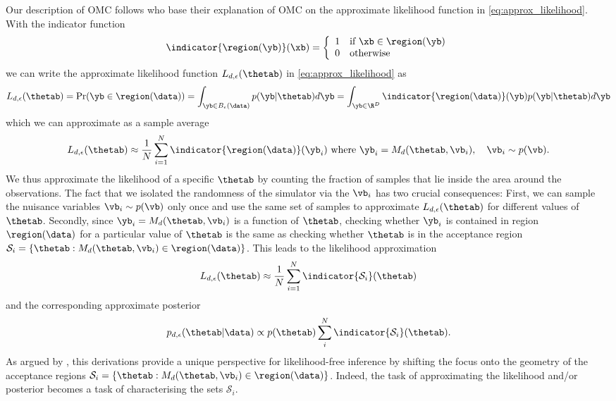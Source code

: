 Our description of OMC \citep{Meeds2015}
follows \citet{Ikonomov2019} who base their explanation of OMC on the
approximate likelihood function in \eqref{eq:approx_likelihood}. With
the indicator function
%
\begin{equation} \label{eq:indicator} \indicator{\region(\yb)}(\xb)=
  \left\{
    \begin{array}{ll}
      1 & \mbox{if } \xb \in \region(\yb) \\
      0 & \mbox{otherwise} 
    \end{array} \right. \end{equation}
%
we can write the approximate likelihood function $L_{d, \epsilon}(\thetab)$ in \eqref{eq:approx_likelihood} as
\begin{gather} \label{eq:approx_likelihood_omc}
  L_{d, \epsilon}(\thetab) = \Pr(\yb \in \region(\data)) =
  \int_{\yb \in B_\epsilon(\data)}p(\yb|\thetab)d\yb =
  \int_{\yb \in \R^D} \indicator{\region(\data)}(\yb)p(\yb|\thetab)d\yb
\end{gather}
which we can approximate as a sample average
\begin{equation}
L_{d, \epsilon}(\thetab) \approx \frac{1}{N} \sum_{i=1}^N \indicator{\region (\data)} (\yb_i)
  \text{ where } \yb_i = M_d(\thetab, \vb_i), \quad \vb_i \sim p(\vb). \label{eq:alt_view}
\end{equation}
We thus approximate the likelihood of a specific $\thetab$ by counting
the fraction of samples that lie inside the area around the
observations. The fact that we isolated the randomness of the
simulator via the $\vb_i$ has two crucial consequences: First, we can
sample the nuisance variables $\vb_i \sim p(\vb)$ only once and use
the same set of samples to approximate $L_{d,\epsilon}(\thetab)$ for
different values of $\thetab$. Secondly, since
$\yb_i=M_d(\thetab, \vb_i)$ is a function of $\thetab$, checking
whether $\yb_i$ is contained in region $\region (\data)$ for a
particular value of $\thetab$ is the same as checking whether
$\thetab$ is in the acceptance region $\mathcal{S}_i = \{ \thetab:
M_d(\thetab, \vb_i) \in \region(\data) \}$. This leads to the
likelihood approximation
\begin{equation}
L_{d, \epsilon}(\thetab) \approx \frac{1}{N} \sum_{i=1}^N \indicator{\mathcal{S}_i}(\thetab) \label{eq:alt_view_theta}
\end{equation}
and the corresponding approximate posterior
\begin{equation} \label{eq:approx_posterior_omc}
  p_{d,\epsilon}(\thetab|\data) \propto
  p(\thetab) \sum_i^N  \indicator{\mathcal{S}_i}(\thetab).
\end{equation}
As argued by \citet{Ikonomov2019}, this derivations provide a unique
perspective for likelihood-free inference by shifting the focus onto
the geometry of the acceptance regions $\mathcal{S}_i = \{ \thetab:
M_d(\thetab, \vb_i) \in \region(\data)\}$. Indeed, the task of
approximating the likelihood and/or posterior becomes a task of
characterising the sets $\mathcal{S}_i$.


